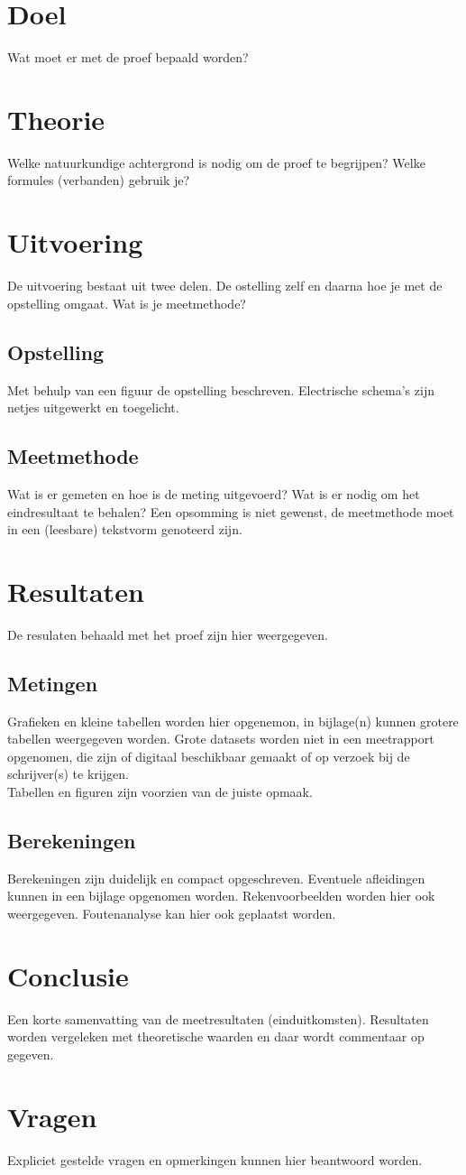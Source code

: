 \documentclass[10pt]{TISmeetrapport}
\begin{document}
\makecoverpage
{}
\section{Doel}
Wat moet er met de proef bepaald worden?

\section{Theorie}
Welke natuurkundige achtergrond is nodig om de proef te begrijpen? Welke formules (verbanden) gebruik je?

\section{Uitvoering}
De uitvoering bestaat uit twee delen. De ostelling zelf en daarna hoe je met de opstelling omgaat. Wat is je meetmethode?
\subsection{Opstelling}
Met behulp van een figuur de opstelling beschreven. Electrische schema's zijn netjes uitgewerkt en toegelicht. 
\subsection{Meetmethode}
Wat is er gemeten en hoe is de meting uitgevoerd? Wat is er nodig om het eindresultaat te behalen? Een opsomming is niet gewenst, de meetmethode moet in een (leesbare) tekstvorm genoteerd zijn.

\section{Resultaten}
De resulaten behaald met het proef zijn hier weergegeven. 
\subsection{Metingen}
Grafieken en kleine tabellen worden hier opgenemon, in bijlage(n) kunnen grotere tabellen weergegeven worden. Grote datasets worden niet in een meetrapport opgenomen, die zijn of digitaal beschikbaar gemaakt of op verzoek bij de schrijver(s) te krijgen. \\
Tabellen en figuren zijn voorzien van de juiste opmaak.

\subsection{Berekeningen}
Berekeningen zijn duidelijk en compact opgeschreven. Eventuele afleidingen kunnen in een bijlage opgenomen worden. Rekenvoorbeelden worden hier ook weergegeven. Foutenanalyse kan hier ook geplaatst worden.

\section{Conclusie}
Een korte samenvatting van de meetresultaten (einduitkomsten). Resultaten worden vergeleken met theoretische waarden en daar wordt commentaar op gegeven. 

\section{Vragen}
Expliciet gestelde vragen en opmerkingen kunnen hier beantwoord worden. 
\end{document}
